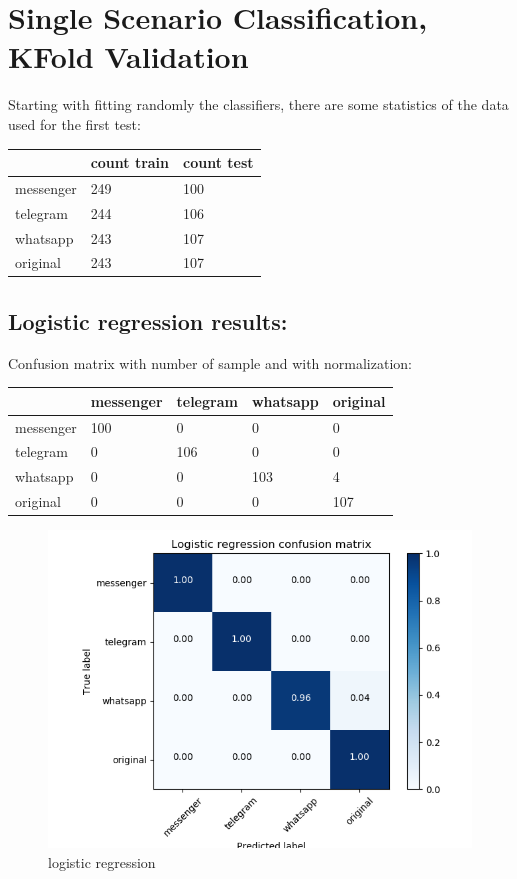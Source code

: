 \chapter{Single Scenario Classification, KFold Validation}Starting with fitting randomly the classifiers, there are some statistics of the data used for the first test: \\
 {\def\arraystretch{1.3} 
 \begin{table}[H] 
\centering 
\begin{tabular}{|l|l|l|} 
\hline 
  &count train  &count test  \\ \hline
messenger  &249  &100  \\ \hline
telegram  &244  &106  \\ \hline
whatsapp  &243  &107  \\ \hline
original  &243  &107  \\ \hline
\end{tabular} 
\end{table} }
\section{Logistic regression results:} 
Confusion matrix with number of sample and with normalization:
 {\def\arraystretch{1.3} 
 \begin{table}[H] 
\centering 
\begin{tabular}{|l|l|l|l|l|} 
\hline 
  &messenger  &telegram  &whatsapp  &original  \\ \hline
messenger  &100  &0  &0  &0  \\ \hline
telegram  &0  &106  &0  &0  \\ \hline
whatsapp  &0  &0  &103  &4  \\ \hline
original  &0  &0  &0  &107  \\ \hline
\end{tabular} 
\end{table} }

 \begin{figure}[H] 
\centering 
\includegraphics[scale=.6]{images/lr_initial.png} 
\caption{logistic regression} 
\end{figure} 


